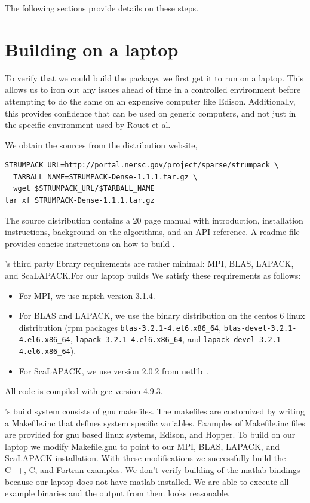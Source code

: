\documentclass{acmsmall}
\begin{document}
The following sections provide details on these steps.


\section{Building \strumpack{} on a laptop}

To verify that we could build the package, we first get it to run
on a laptop.  This allows us to iron out any issues ahead of time
in a controlled environment before attempting to do the same on
an expensive computer like Edison.  Additionally, this provides
confidence that \strumpack{} can be used on generic computers, and
not just in the specific environment used by Rouet et al.

We obtain the sources from the \strumpack{} distribution website,
\begin{verbatim}
STRUMPACK_URL=http://portal.nersc.gov/project/sparse/strumpack \
  TARBALL_NAME=STRUMPACK-Dense-1.1.1.tar.gz \
  wget $STRUMPACK_URL/$TARBALL_NAME
tar xf STRUMPACK-Dense-1.1.1.tar.gz
\end{verbatim}

The source distribution contains a 20 page manual with
introduction, installation instructions, background on the
algorithms, and an API reference.  A readme file
provides concise instructions on how to build \strumpack{}.

\strumpack{}'s third party library requirements are rather
minimal: MPI, BLAS, LAPACK, and ScaLAPACK.\@ For our laptop
builds We satisfy these requirements as follows:
\begin{itemize}
\item For MPI, we use mpich version 3.1.4.
\item For BLAS and LAPACK, we use the binary distribution on
the centos 6 linux distribution (rpm packages
\verb!blas-3.2.1-4.el6.x86_64!,
\verb!blas-devel-3.2.1-4.el6.x86_64!,
\verb!lapack-3.2.1-4.el6.x86_64!, and
\verb!lapack-devel-3.2.1-4.el6.x86_64!).
\item For ScaLAPACK, we use version 2.0.2 from netlib~\cite{netlib}.
\end{itemize}
All code is compiled with gcc version 4.9.3.

\strumpack{}'s build system consists of gnu makefiles.  The
makefiles are customized by writing a Makefile.inc that defines
system specific variables.  Examples of Makefile.inc files are
provided for gnu based linux systems, Edison, and Hopper.  To
build on our laptop we modify Makefile.gnu to point to our MPI,
BLAS, LAPACK, and ScaLAPACK installation.  With these
modifications we successfully build the C++, C, and Fortran
examples.  We don't verify building of the matlab bindings
because our laptop does not have matlab installed.  We are able
to execute all example binaries and the output from them looks
reasonable.
\end{document}
